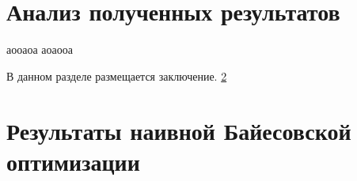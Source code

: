 \documentclass[times,specification,annotation]{itmo-student-thesis}
\begin{document}
	\chapter{Анализ полученных результатов}
	аооаоа
	\chapterconclusion
	аоаооа
	
	
	\startconclusionpage
	В данном разделе размещается заключение. \ref{sec:app:1}
	
	\printmainbibliography
	
	
	\appendix
	\chapter{Результаты наивной Байесовской оптимизации}\label{sec:app:1}
\end{document}
